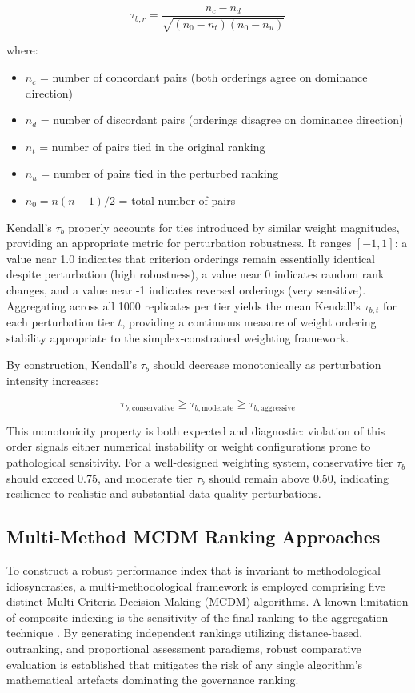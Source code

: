 \documentclass[12pt,a4paper]{article}
\begin{document}
\begin{equation}
\tau_{b,r} = \frac{n_c - n_d}{\sqrt{(n_0 - n_t)(n_0 - n_u)}}
\end{equation}

where:
\begin{itemize}
  \item $n_c$ = number of concordant pairs (both orderings agree on dominance direction)
  \item $n_d$ = number of discordant pairs (orderings disagree on dominance direction)
  \item $n_t$ = number of pairs tied in the original ranking
  \item $n_u$ = number of pairs tied in the perturbed ranking
  \item $n_0 = n(n-1)/2$ = total number of pairs
\end{itemize}

Kendall's $\tau_b$ properly accounts for ties introduced by similar weight magnitudes, providing an appropriate metric for perturbation robustness. It ranges $[-1, 1]$: a value near 1.0 indicates that criterion orderings remain essentially identical despite perturbation (high robustness), a value near 0 indicates random rank changes, and a value near -1 indicates reversed orderings (very sensitive). Aggregating across all 1000 replicates per tier yields the mean Kendall's $\tau_{b,t}$ for each perturbation tier $t$, providing a continuous measure of weight ordering stability appropriate to the simplex-constrained weighting framework.

By construction, Kendall's $\tau_b$ should decrease monotonically as perturbation intensity increases:

$$\tau_{b,\text{conservative}} \geq \tau_{b,\text{moderate}} \geq \tau_{b,\text{aggressive}}$$

This monotonicity property is both expected and diagnostic: violation of this order signals either numerical instability or weight configurations prone to pathological sensitivity. For a well-designed weighting system, conservative tier $\tau_b$ should exceed 0.75, and moderate tier $\tau_b$ should remain above 0.50, indicating resilience to realistic and substantial data quality perturbations.

\subsection{Multi-Method MCDM Ranking Approaches}
\label{subsec:mcdm}

To construct a robust performance index that is invariant to methodological idiosyncrasies, a multi-methodological framework is employed comprising five distinct Multi-Criteria Decision Making (MCDM) algorithms. A known limitation of composite indexing is the sensitivity of the final ranking to the aggregation technique \citep{Greco2016}. By generating independent rankings utilizing distance-based, outranking, and proportional assessment paradigms, robust comparative evaluation is established that mitigates the risk of any single algorithm's mathematical artefacts dominating the governance ranking.
\end{document}
